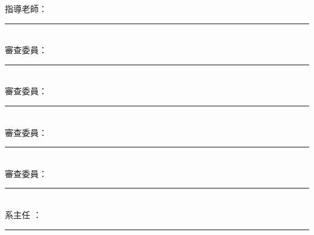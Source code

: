 \begin{center}
指導老師：\rule{0.4\textwidth}{1pt} \\[0.3cm]
審查委員：\rule{0.4\textwidth}{1pt} \\[0.3cm]
審查委員：\rule{0.4\textwidth}{1pt} \\[0.3cm]
審查委員：\rule{0.4\textwidth}{1pt} \\[0.3cm]
審查委員：\rule{0.4\textwidth}{1pt} \\[0.3cm]
系主任  ：\rule{0.4\textwidth}{1pt} \\[0.3cm]

\vfill
{}%
%
\end{center}

\clearpage
\normalsize


